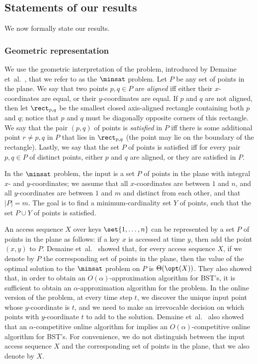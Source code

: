 \subsection{Statements of our results}

We now formally state our results.

\subsubsection{Geometric representation} 

%



 
We use the geometric interpretation of the
problem, introduced by Demaine et~al.~\cite{DHIKP09}, that we refer to as the $\minsat$ problem. 
Let $P$ be any set of points in the plane. We say that two points $p,q\in P$ are \emph{aligned} iff either their $x$-coordinates are equal, or their $y$-coordinates are equal. If $p$ and $q$ are not aligned, then  let $\rect_{p,q}$ be the smallest closed axis-aligned rectangle containing both $p$ and $q$; notice that $p$ and $q$ must be diagonally opposite corners of this rectangle. We say that the pair $(p,q)$ of points is \emph{satisfied} in $P$ iff there is some additional point $r\neq p,q$ in $P$ that lies in $\rect_{p,q}$ (the point may lie on the boundary of the rectangle).
Lastly, we say that the set $P$ of points is satisfied iff for every pair $p,q\in P$ of distinct points, either $p$ and $q$ are aligned, or they are satisfied in $P$.

In the $\minsat$ problem, the input is a set $P$ of points in the plane with integral $x$- and $y$-coordinates; we assume that all $x$-coordinates are between $1$ and $n$, and all $y$-coordinates are between $1$ and $m$ and distinct from each other, and that $|P|=m$. The goal is to find a minimum-cardinality set $Y$ of points, such that the set $P\cup Y$ of points is satisfied.

An access sequence $X$ over keys $\set{1,\ldots,n}$ can be represented by a set $P$ of points in the plane as follows:
if a key $x$ is accessed at time $y$, then add the point $(x,y)$ to $P$.
Demaine et~al.~\cite{DHIKP09} showed that, for every access sequence $X$, if we denote by $P$ the corresponding set of points in the plane, then the value of the optimal solution to the $\minsat$ problem on $P$ is $\Theta(\opt(X))$. They also showed that, in order to obtain an $O(\alpha)$-approximation algorithm for BST's, it is sufficient to obtain an $\alpha$-approximation algorithm for the \minsat problem. In the online version of the \minsat problem, at every time step $t$, we discover the unique input point whose $y$-coordinate is $t$, and we need to make an irrevocable decision on which points with $y$-coordinate $t$ to add to the solution. Demaine et~al.~\cite{DHIKP09} also showed that an $\alpha$-competitive online algorithm for \minsat implies an $O(\alpha)$-competitive online algorithm for BST's.
For convenience, we do not distinguish between the input access sequence $X$ and the corresponding set of points in the plane, that we also denote by $X$.




